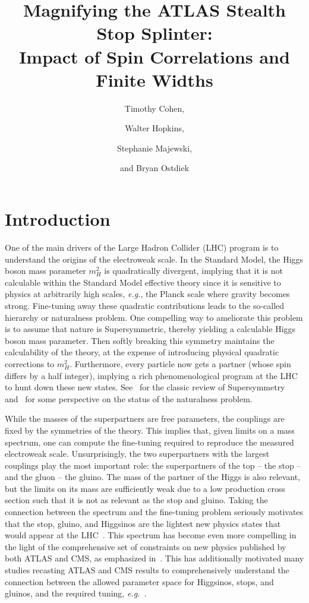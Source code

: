 \documentclass[a4paper,12pt]{article}
\title{\Large 
Magnifying the ATLAS Stealth Stop Splinter: \\[5pt]
Impact of Spin Correlations and Finite Widths
}
\author{Timothy Cohen,}
\author{Walter Hopkins,}
\author{Stephanie Majewski,}
\author{and Bryan Ostdiek\\[-10pt]}
\affiliation{Institute of Theoretical Science and Center for High Energy Physics, \\[2pt] Department of Physics, University of Oregon, Eugene, Oregon 97403}
\begin{document}
\maketitle
\flushbottom

\setcounter{page}{2}
\section{Introduction}
\label{sec:intro}
One of the main drivers of the Large Hadron Collider (LHC) program is to understand the origins of the electroweak scale.  In the Standard Model, the Higgs boson mass parameter $m_H^2$ is quadratically divergent, implying that it is not calculable within the Standard Model effective theory since it is sensitive to physics at arbitrarily high scales, \emph{e.g.}, the Planck scale where gravity becomes strong.  Fine-tuning away these quadratic contributions leads to the so-called hierarchy or naturalness problem.  One compelling way to ameliorate this problem is to assume that nature is Supersymmetric, thereby yielding a calculable Higgs boson mass parameter.  Then softly breaking this symmetry maintains the calculability of the theory, at the expense of introducing physical quadratic corrections to $m_H^2$.  Furthermore, every particle now gets a partner (whose spin differs by a half integer), implying a rich phenomenological program at the LHC to hunt down these new states. See~\cite{Martin:1997ns} for the classic review of Supersymmetry and~\cite{Giudice:2017pzm} for some perspective on the status of the naturalness problem.

While the masses of the superpartners are free parameters, the couplings are fixed by the symmetries of the theory.  This implies that, given limits on a mass spectrum, one can compute the fine-tuning required to reproduce the measured electroweak scale.  Unsurprisingly, the two superpartners with the largest couplings play the most important role: the superpartners of the top -- the stop -- and the gluon -- the gluino.  The mass of the partner of the Higgs is also relevant, but the limits on its mass are sufficiently weak due to a low production cross section such that it is not as relevant as the stop and gluino.  Taking the connection between the spectrum and the fine-tuning problem seriously motivates that the stop, gluino, and Higgsinos are the lightest new physics states that would appear at the LHC~\cite{Dimopoulos:1995mi, Cohen:1996vb}.  This spectrum has become even more compelling in the light of the comprehensive set of constraints on new physics published by both ATLAS and CMS, as emphasized in~\cite{Papucci:2011wy, Brust:2011tb, Buckley:2016tbs}.  This has additionally motivated many studies recasting ATLAS and CMS results to comprehensively understand the connection between the allowed parameter space for Higgsinos, stops, and gluinos, and the required tuning, \emph{e.g.}~\cite{Evans:2013jna, Papucci:2014rja, Buckley:2016kvr}.  
\end{document}
